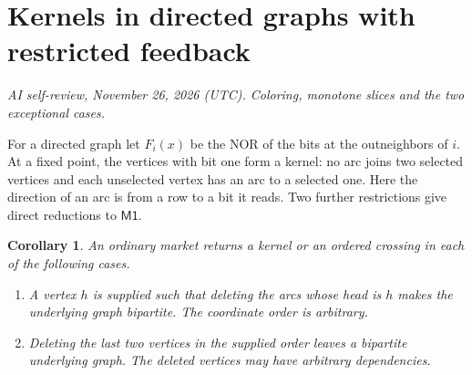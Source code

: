 \documentclass[11pt,oneside,openany,notitlepage]{report}
\newtheorem{corollary}[theorem]{Corollary}
\newcommand{\Market}{\mathsf{M1}}
\newcommand{\reviewdate}{November 26, 2026 (UTC)}
\newcommand{\reviewmark}[1]{\par\nopagebreak[4]\noindent
  {\footnotesize\itshape AI self-review, \reviewdate. #1\par}\nobreak\smallskip}
\begin{document}
\section{Kernels in directed graphs with restricted feedback}
\reviewmark{Coloring, monotone slices and the two exceptional cases.}

For a directed graph let \(F_i(x)\) be the NOR of the bits at the
outneighbors of \(i\). At a fixed point, the vertices with bit one
form a kernel: no arc joins two selected vertices and each unselected
vertex has an arc to a selected one. Here the direction of an arc is
from a row to a bit it reads. Two further restrictions give direct
reductions to \(\Market\).

\begin{corollary}\label{cor:nor}
An ordinary market returns a kernel or an ordered crossing in each of
the following cases.
\begin{enumerate}
\item A vertex \(h\) is supplied such that deleting the arcs whose head
is \(h\) makes the underlying graph bipartite. The coordinate order
is arbitrary.
\item Deleting the last two vertices in the supplied order leaves a
bipartite underlying graph. The deleted vertices may have arbitrary
dependencies.
\end{enumerate}
\end{corollary}
\end{document}
